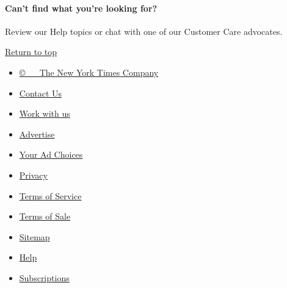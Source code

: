\hypertarget{cant-find-what-youre-looking-for}{%
\paragraph{Can't find what you're looking
for?}\label{cant-find-what-youre-looking-for}}

Review our Help topics or chat with one of our Customer Care advocates.

\protect\hyperlink{article-container}{Return to top}

\begin{itemize}
\tightlist
\item
  \href{http://www.nytimes3xbfgragh.onion/content/help/rights/copyright/copyright-notice.html}{©~
  ~ The New York Times Company }
\end{itemize}

\begin{itemize}
\tightlist
\item
  \href{https://help.nytimes3xbfgragh.onion/hc/en-us/articles/115015385887-Contact-Us}{Contact
  Us}
\item
  \href{http://www.nytco.com/careers}{Work with us}
\item
  \href{http://nytmediakit.com/}{Advertise}
\item
  \href{https://www.nytimes3xbfgragh.onion/content/help/rights/privacy/policy/privacy-policy.html\#pp}{Your
  Ad Choices}
\item
  \href{https://www.nytimes3xbfgragh.onion/privacy}{Privacy}
\item
  \href{https://www.nytimes3xbfgragh.onion/ref/membercenter/help/agree.html}{Terms
  of Service}
\item
  \href{https://www.nytimes3xbfgragh.onion/content/help/rights/sale/terms-of-sale.html}{Terms
  of Sale}
\item
  \href{http://spiderbites.nytimes3xbfgragh.onion}{Sitemap}
\item
  \href{/hc/en-us}{Help}
\item
  \href{https://www.nytimes3xbfgragh.onion/subscriptions/Multiproduct/lp5558.html?campaignId=37WXW}{Subscriptions}
\end{itemize}
